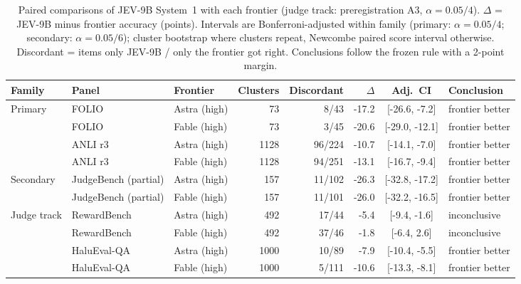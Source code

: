 \begin{table}[t]
\centering\small
\caption{Paired comparisons of JEV-9B System~1 with each frontier (judge track: preregistration A3, $\alpha=0.05/4$). $\Delta$ = JEV-9B minus frontier accuracy (points).
Intervals are Bonferroni-adjusted within family (primary: $\alpha=0.05/4$; secondary: $\alpha=0.05/6$); cluster bootstrap where clusters repeat, Newcombe paired score interval otherwise.
Discordant = items only JEV-9B / only the frontier got right. Conclusions follow the frozen rule with a 2-point margin.}
\label{tab:paired}
\begin{tabular}{@{}lllrrrcl@{}}
\toprule
Family & Panel & Frontier & Clusters & Discordant & $\Delta$ & Adj.\ CI & Conclusion \\
\midrule
Primary & FOLIO & Astra (high) & 73 & 8/43 & -17.2 & [-26.6, -7.2] & frontier better \\
 & FOLIO & Fable (high) & 73 & 3/45 & -20.6 & [-29.0, -12.1] & frontier better \\
 & ANLI r3 & Astra (high) & 1128 & 96/224 & -10.7 & [-14.1, -7.0] & frontier better \\
 & ANLI r3 & Fable (high) & 1128 & 94/251 & -13.1 & [-16.7, -9.4] & frontier better \\
\midrule
Secondary & JudgeBench (partial) & Astra (high) & 157 & 11/102 & -26.3 & [-32.8, -17.2] & frontier better \\
 & JudgeBench (partial) & Fable (high) & 157 & 11/101 & -26.0 & [-32.2, -16.5] & frontier better \\
\midrule
Judge track & RewardBench & Astra (high) & 492 & 17/44 & -5.4 & [-9.4, -1.6] & inconclusive \\
 & RewardBench & Fable (high) & 492 & 37/46 & -1.8 & [-6.4, 2.6] & inconclusive \\
 & HaluEval-QA & Astra (high) & 1000 & 10/89 & -7.9 & [-10.4, -5.5] & frontier better \\
 & HaluEval-QA & Fable (high) & 1000 & 5/111 & -10.6 & [-13.3, -8.1] & frontier better \\
\bottomrule
\end{tabular}
\end{table}
